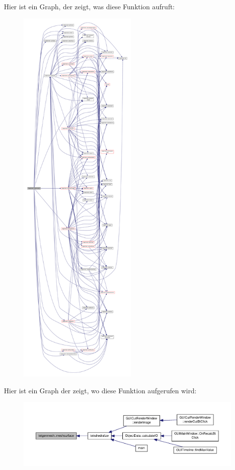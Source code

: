 Hier ist ein Graph, der zeigt, was diese Funktion aufruft\-:\nopagebreak
\begin{figure}[H]
\begin{center}
\leavevmode
\includegraphics[height=550pt]{classtetgenmesh_a0c51cd3511d2b0ef9d0d45fe8b546b2e_cgraph}
\end{center}
\end{figure}




Hier ist ein Graph der zeigt, wo diese Funktion aufgerufen wird\-:\nopagebreak
\begin{figure}[H]
\begin{center}
\leavevmode
\includegraphics[width=350pt]{classtetgenmesh_a0c51cd3511d2b0ef9d0d45fe8b546b2e_icgraph}
\end{center}
\end{figure}


